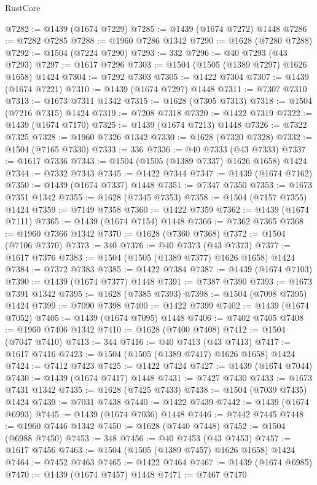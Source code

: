\begin{lexlean}{RustCore}
\begin{coremodule}
@7282 := @1439 (@1674 @7229)
@7285 := @1439 (@1674 @7272) @1448
@7286 := @7282 @7285
@7288 := @1960 @7286 @1342
@7290 := @1628 (@7280 @7288)
@7292 := @1504 (@7224 @7290)
@7293 := 332
@7296 := @40 @7293 (@43 @7293)
@7297 := @1617 @7296
@7303 := @1504 (@1505 (@1389 @7297) @1626 @1658) @1424
@7304 := @7292 @7303
@7305 := @1422 @7304
@7307 := @1439 (@1674 @7221)
@7310 := @1439 (@1674 @7297) @1448
@7311 := @7307 @7310
@7313 := @1673 @7311 @1342
@7315 := @1628 (@7305 @7313)
@7318 := @1504 (@7216 @7315) @1424
@7319 := @7208 @7318
@7320 := @1422 @7319
@7322 := @1439 (@1674 @7170)
@7325 := @1439 (@1674 @7213) @1448
@7326 := @7322 @7325
@7328 := @1960 @7326 @1342
@7330 := @1628 (@7320 @7328)
@7332 := @1504 (@7165 @7330)
@7333 := 336
@7336 := @40 @7333 (@43 @7333)
@7337 := @1617 @7336
@7343 := @1504 (@1505 (@1389 @7337) @1626 @1658) @1424
@7344 := @7332 @7343
@7345 := @1422 @7344
@7347 := @1439 (@1674 @7162)
@7350 := @1439 (@1674 @7337) @1448
@7351 := @7347 @7350
@7353 := @1673 @7351 @1342
@7355 := @1628 (@7345 @7353)
@7358 := @1504 (@7157 @7355) @1424
@7359 := @7149 @7358
@7360 := @1422 @7359
@7362 := @1439 (@1674 @7111)
@7365 := @1439 (@1674 @7154) @1448
@7366 := @7362 @7365
@7368 := @1960 @7366 @1342
@7370 := @1628 (@7360 @7368)
@7372 := @1504 (@7106 @7370)
@7373 := 340
@7376 := @40 @7373 (@43 @7373)
@7377 := @1617 @7376
@7383 := @1504 (@1505 (@1389 @7377) @1626 @1658) @1424
@7384 := @7372 @7383
@7385 := @1422 @7384
@7387 := @1439 (@1674 @7103)
@7390 := @1439 (@1674 @7377) @1448
@7391 := @7387 @7390
@7393 := @1673 @7391 @1342
@7395 := @1628 (@7385 @7393)
@7398 := @1504 (@7098 @7395) @1424
@7399 := @7090 @7398
@7400 := @1422 @7399
@7402 := @1439 (@1674 @7052)
@7405 := @1439 (@1674 @7095) @1448
@7406 := @7402 @7405
@7408 := @1960 @7406 @1342
@7410 := @1628 (@7400 @7408)
@7412 := @1504 (@7047 @7410)
@7413 := 344
@7416 := @40 @7413 (@43 @7413)
@7417 := @1617 @7416
@7423 := @1504 (@1505 (@1389 @7417) @1626 @1658) @1424
@7424 := @7412 @7423
@7425 := @1422 @7424
@7427 := @1439 (@1674 @7044)
@7430 := @1439 (@1674 @7417) @1448
@7431 := @7427 @7430
@7433 := @1673 @7431 @1342
@7435 := @1628 (@7425 @7433)
@7438 := @1504 (@7039 @7435) @1424
@7439 := @7031 @7438
@7440 := @1422 @7439
@7442 := @1439 (@1674 @6993)
@7445 := @1439 (@1674 @7036) @1448
@7446 := @7442 @7445
@7448 := @1960 @7446 @1342
@7450 := @1628 (@7440 @7448)
@7452 := @1504 (@6988 @7450)
@7453 := 348
@7456 := @40 @7453 (@43 @7453)
@7457 := @1617 @7456
@7463 := @1504 (@1505 (@1389 @7457) @1626 @1658) @1424
@7464 := @7452 @7463
@7465 := @1422 @7464
@7467 := @1439 (@1674 @6985)
@7470 := @1439 (@1674 @7457) @1448
@7471 := @7467 @7470

\end{coremodule}
\end{lexlean}
